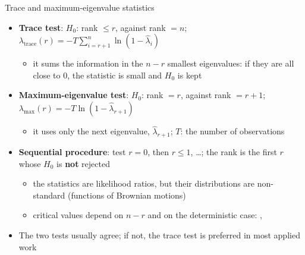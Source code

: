 \begin{frame}{Trace and maximum-eigenvalue statistics}
\itemsize{\small}
\begin{itemize}
    \item \textbf{Trace test}: $H_0$: rank $\le r$, against rank $= n$; \quad $\lambda_{\mathrm{trace}}(r) = -T\sum_{i=r+1}^{n}\ln(1 - \hat\lambda_i)$
    \begin{itemize}
        \item it sums the information in the $n - r$ smallest eigenvalues: if they are all close to 0, the statistic is small and $H_0$ is kept
    \end{itemize}
    \item \textbf{Maximum-eigenvalue test}: $H_0$: rank $= r$, against rank $= r + 1$; \quad $\lambda_{\max}(r) = -T\ln(1 - \hat\lambda_{r+1})$
    \begin{itemize}
        \item it uses only the next eigenvalue, $\hat\lambda_{r+1}$; $T$: the number of observations
    \end{itemize}
    \item \textbf{Sequential procedure}: test $r = 0$, then $r \le 1$, \dots; the rank is the first $r$ whose $H_0$ is \textbf{not} rejected
    \begin{itemize}
        \item the statistics are likelihood ratios, but their distributions are non-standard (functions of Brownian motions)
        \item critical values depend on $n - r$ and on the deterministic case: , 
    \end{itemize}
    \item The two tests usually agree; if not, the trace test is preferred in most applied work
\end{itemize}
\end{frame}

